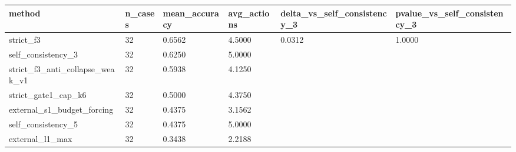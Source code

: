 \begin{tabular}{llllll}
\hline
method & n\_cases & mean\_accuracy & avg\_actions & delta\_vs\_self\_consistency\_3 & pvalue\_vs\_self\_consistency\_3 \\
\hline
strict\_f3 & 32 & 0.6562 & 4.5000 & 0.0312 & 1.0000 \\
self\_consistency\_3 & 32 & 0.6250 & 5.0000 &  &  \\
strict\_f3\_anti\_collapse\_weak\_v1 & 32 & 0.5938 & 4.1250 &  &  \\
strict\_gate1\_cap\_k6 & 32 & 0.5000 & 4.3750 &  &  \\
external\_s1\_budget\_forcing & 32 & 0.4375 & 3.1562 &  &  \\
self\_consistency\_5 & 32 & 0.4375 & 5.0000 &  &  \\
external\_l1\_max & 32 & 0.3438 & 2.2188 &  &  \\
\hline
\end{tabular}
